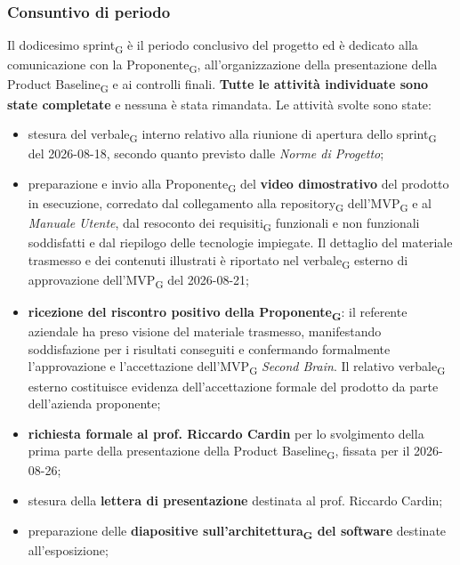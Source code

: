 ﻿\documentclass[a4paper, 10pt, colorlinks=true, linkcolor=black, urlcolor=blue, citecolor=blue, hidelinks]{article}
\begin{document}
\subsubsection{Consuntivo di periodo}
Il dodicesimo sprint\textsubscript{G} è il periodo conclusivo del progetto ed è dedicato alla comunicazione con la Proponente\textsubscript{G}, all'organizzazione della presentazione della Product Baseline\textsubscript{G} e ai controlli finali. \textbf{Tutte le attività individuate sono state completate} e nessuna è stata rimandata. Le attività svolte sono state:
\begin{itemize}
    \item stesura del verbale\textsubscript{G} interno relativo alla riunione di apertura dello sprint\textsubscript{G} del 2026-08-18, secondo quanto previsto dalle \textit{Norme di Progetto};

    \item preparazione e invio alla Proponente\textsubscript{G} del \textbf{video dimostrativo} del prodotto in esecuzione, corredato dal collegamento alla repository\textsubscript{G} dell'MVP\textsubscript{G} e al \textit{Manuale Utente}, dal resoconto dei requisiti\textsubscript{G} funzionali e non funzionali soddisfatti e dal riepilogo delle tecnologie impiegate. Il dettaglio del materiale trasmesso e dei contenuti illustrati è riportato nel verbale\textsubscript{G} esterno di approvazione dell'MVP\textsubscript{G} del 2026-08-21;

    \item \textbf{ricezione del riscontro positivo della Proponente\textsubscript{G}}: il referente aziendale ha preso visione del materiale trasmesso, manifestando soddisfazione per i risultati conseguiti e confermando formalmente l'approvazione e l'accettazione dell'MVP\textsubscript{G} \textit{Second Brain}. Il relativo verbale\textsubscript{G} esterno costituisce evidenza dell'accettazione formale del prodotto da parte dell'azienda proponente;

    \item \textbf{richiesta formale al prof. Riccardo Cardin} per lo svolgimento della prima parte della presentazione della Product Baseline\textsubscript{G}, fissata per il 2026-08-26;

    \item stesura della \textbf{lettera di presentazione} destinata al prof. Riccardo Cardin;

    \item preparazione delle \textbf{diapositive sull'architettura\textsubscript{G} del software} destinate all'esposizione;


\end{itemize}
\end{document}
